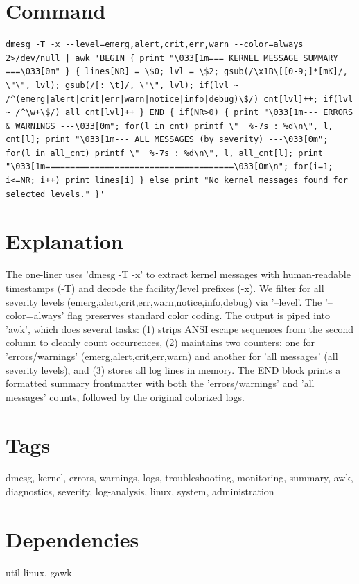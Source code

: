 \documentclass[openany]{book}
\begin{document}
\section*{Command}
\begin{lstlisting}
dmesg -T -x --level=emerg,alert,crit,err,warn --color=always 2>/dev/null | awk 'BEGIN { print "\033[1m=== KERNEL MESSAGE SUMMARY ===\033[0m" } { lines[NR] = \$0; lvl = \$2; gsub(/\x1B\[[0-9;]*[mK]/, \"\", lvl); gsub(/[: \t]/, \"\", lvl); if(lvl ~ /^(emerg|alert|crit|err|warn|notice|info|debug)\$/) cnt[lvl]++; if(lvl ~ /^\w+\$/) all_cnt[lvl]++ } END { if(NR>0) { print "\033[1m--- ERRORS & WARNINGS ---\033[0m"; for(l in cnt) printf \"  %-7s : %d\n\", l, cnt[l]; print "\033[1m--- ALL MESSAGES (by severity) ---\033[0m"; for(l in all_cnt) printf \"  %-7s : %d\n\", l, all_cnt[l]; print "\033[1m======================================\033[0m\n"; for(i=1; i<=NR; i++) print lines[i] } else print "No kernel messages found for selected levels." }'
\end{lstlisting}

\section*{Explanation}
The one-liner uses 'dmesg -T -x' to extract kernel messages with human-readable timestamps (-T) and decode the facility/level prefixes (-x). We filter for all severity levels (emerg,alert,crit,err,warn,notice,info,debug) via '--level'. The '--color=always' flag preserves standard color coding. The output is piped into 'awk', which does several tasks: (1) strips ANSI escape sequences from the second column to cleanly count occurrences, (2) maintains two counters: one for 'errors/warnings' (emerg,alert,crit,err,warn) and another for 'all messages' (all severity levels), and (3) stores all log lines in memory. The END block prints a formatted summary frontmatter with both the 'errors/warnings' and 'all messages' counts, followed by the original colorized logs.

\section*{Tags}
dmesg, kernel, errors, warnings, logs, troubleshooting, monitoring, summary, awk, diagnostics, severity, log-analysis, linux, system, administration

\section*{Dependencies}
util-linux, gawk
\end{document}
